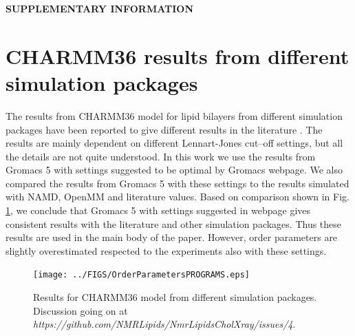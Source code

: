 \documentclass[aps,prl,superscriptaddress,twocolumn]{revtex4}
\begin{document}
%

\begin{acknowledgments}
\end{acknowledgments}
\newpage
\appendix
\begin{center}
{\bf SUPPLEMENTARY INFORMATION}
\end{center}
\section{CHARMM36 results from different simulation packages}
The results from CHARMM36 model for lipid bilayers from different 
simulation packages have been reported to give different results in
the literature \cite{piggot12,lee16}. The results are mainly
dependent on different Lennart-Jones cut--off settings, but
all the details are not quite understood. In this work we use
the results from Gromacs 5 with settings suggested to be optimal
by Gromacs webpage. We also compared the results from Gromacs 5 with
these settings to the results simulated with NAMD, OpenMM and literature
values. Based on comparison shown in Fig. \ref{programsCOMP}, we conclude
that Gromacs 5 with settings suggested in webpage gives consistent
results with the literature and other simulation packages. Thus these
results are used in the main body of the paper. However, order parameters
are slightly overestimated respected to the experiments also with these
settings. \\
 \begin{figure}[]
  \centering
  \texttt{[image: ../FIGS/OrderParametersPROGRAMS.eps]}

  \caption{\label{programsCOMP}
    Results for CHARMM36 model \cite{klauda10} from different simulation packages.
    Discussion going on at {\it https://github.com/NMRLipids/NmrLipidsCholXray/issues/4}.
  }
\end{figure}




\listoftodos
\end{document}
